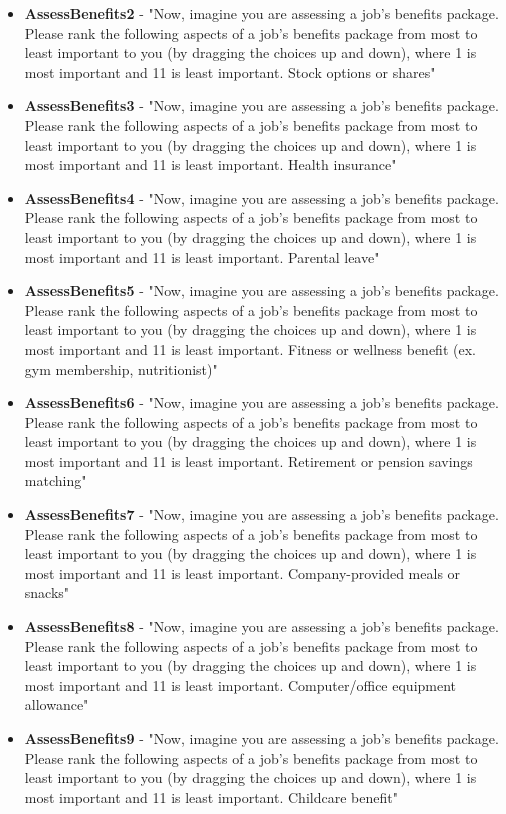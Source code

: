 \begin{appendices}
\begin{itemize}
        \item \textbf{AssessBenefits2} - "Now, imagine you are assessing a job's benefits package. Please rank the following aspects of a job's benefits package from most to least important to you (by dragging the choices up and down), where 1 is most important and 11 is least important. Stock options or shares"
        \item \textbf{AssessBenefits3} - "Now, imagine you are assessing a job's benefits package. Please rank the following aspects of a job's benefits package from most to least important to you (by dragging the choices up and down), where 1 is most important and 11 is least important. Health insurance"
        \item \textbf{AssessBenefits4} - "Now, imagine you are assessing a job's benefits package. Please rank the following aspects of a job's benefits package from most to least important to you (by dragging the choices up and down), where 1 is most important and 11 is least important. Parental leave"
        \item \textbf{AssessBenefits5} - "Now, imagine you are assessing a job's benefits package. Please rank the following aspects of a job's benefits package from most to least important to you (by dragging the choices up and down), where 1 is most important and 11 is least important. Fitness or wellness benefit (ex. gym membership, nutritionist)"
        \item \textbf{AssessBenefits6} - "Now, imagine you are assessing a job's benefits package. Please rank the following aspects of a job's benefits package from most to least important to you (by dragging the choices up and down), where 1 is most important and 11 is least important. Retirement or pension savings matching"
        \item \textbf{AssessBenefits7} - "Now, imagine you are assessing a job's benefits package. Please rank the following aspects of a job's benefits package from most to least important to you (by dragging the choices up and down), where 1 is most important and 11 is least important. Company-provided meals or snacks"
        \item \textbf{AssessBenefits8} - "Now, imagine you are assessing a job's benefits package. Please rank the following aspects of a job's benefits package from most to least important to you (by dragging the choices up and down), where 1 is most important and 11 is least important. Computer/office equipment allowance"
        \item \textbf{AssessBenefits9} - "Now, imagine you are assessing a job's benefits package. Please rank the following aspects of a job's benefits package from most to least important to you (by dragging the choices up and down), where 1 is most important and 11 is least important. Childcare benefit"

\end{itemize}
\end{appendices}
